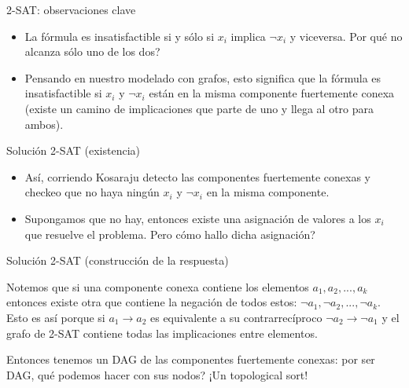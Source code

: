 \documentclass[compress]{beamer}
\begin{document}
\begin{frame}{2-SAT: observaciones clave}
\begin{itemize}
\item La fórmula es insatisfactible si y sólo si $x_i$ implica $\lnot x_i$
y viceversa. \textquestiondown Por qué no alcanza sólo uno de los dos?
\item Pensando en nuestro modelado con grafos, esto significa que
la fórmula es insatisfactible si $x_i$ y $\lnot x_i$ están en la misma
componente fuertemente conexa (existe un camino de implicaciones que parte
de uno y llega al otro para ambos).
\end{itemize}
\end{frame}

\begin{frame}{Solución 2-SAT (existencia)}
\begin{itemize}
\item Así, corriendo Kosaraju detecto las componentes fuertemente conexas
y checkeo que no haya ningún $x_i$ y $\lnot x_i$ en la misma componente.
\item Supongamos que no hay, entonces existe una asignación de valores
a los $x_i$ que resuelve el problema. \textquestiondown Pero cómo hallo 
dicha asignación?
\end{itemize}
\end{frame}

\begin{frame}{Solución 2-SAT (construcción de la respuesta)}

Notemos que si una componente conexa contiene los elementos 
$a_1, a_2, ..., a_k$ entonces existe otra que contiene la negación 
de todos estos: $\lnot a_1, \lnot a_2, ..., \lnot a_k$. \\

\bigskip 
Esto es así porque si $a_1 \rightarrow a_2$ es equivalente a su
contrarrecíproco $\lnot a_2 \rightarrow \lnot a_1$ y el grafo de 2-SAT
contiene todas las implicaciones entre elementos.

\bigskip

Entonces tenemos un DAG de las componentes fuertemente conexas: por ser
DAG, qué podemos hacer con sus nodos? \pause ¡Un topological sort!

\end{frame}
\end{document}
